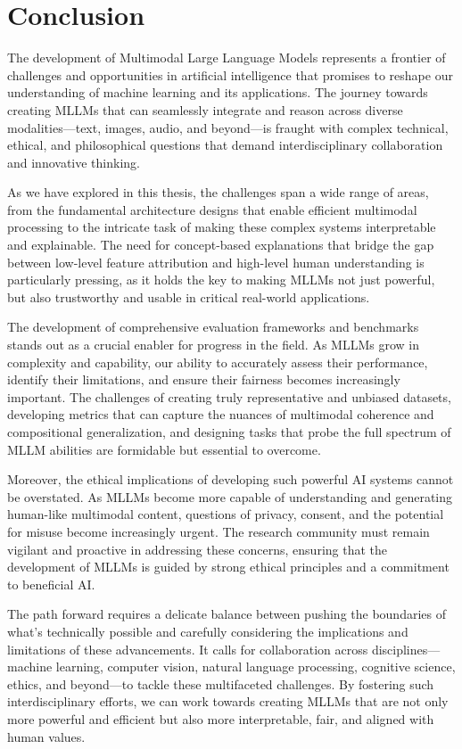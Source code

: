 \section{Conclusion}

The development of Multimodal Large Language Models represents a frontier of challenges and opportunities in artificial intelligence that promises to reshape our understanding of machine learning and its applications. The journey towards creating MLLMs that can seamlessly integrate and reason across diverse modalities—text, images, audio, and beyond—is fraught with complex technical, ethical, and philosophical questions that demand interdisciplinary collaboration and innovative thinking.

As we have explored in this thesis, the challenges span a wide range of areas, from the fundamental architecture designs that enable efficient multimodal processing to the intricate task of making these complex systems interpretable and explainable. The need for concept-based explanations that bridge the gap between low-level feature attribution and high-level human understanding is particularly pressing, as it holds the key to making MLLMs not just powerful, but also trustworthy and usable in critical real-world applications.

The development of comprehensive evaluation frameworks and benchmarks stands out as a crucial enabler for progress in the field. As MLLMs grow in complexity and capability, our ability to accurately assess their performance, identify their limitations, and ensure their fairness becomes increasingly important. The challenges of creating truly representative and unbiased datasets, developing metrics that can capture the nuances of multimodal coherence and compositional generalization, and designing tasks that probe the full spectrum of MLLM abilities are formidable but essential to overcome.

Moreover, the ethical implications of developing such powerful AI systems cannot be overstated. As MLLMs become more capable of understanding and generating human-like multimodal content, questions of privacy, consent, and the potential for misuse become increasingly urgent. The research community must remain vigilant and proactive in addressing these concerns, ensuring that the development of MLLMs is guided by strong ethical principles and a commitment to beneficial AI.

The path forward requires a delicate balance between pushing the boundaries of what's technically possible and carefully considering the implications and limitations of these advancements. It calls for collaboration across disciplines—machine learning, computer vision, natural language processing, cognitive science, ethics, and beyond—to tackle these multifaceted challenges. By fostering such interdisciplinary efforts, we can work towards creating MLLMs that are not only more powerful and efficient but also more interpretable, fair, and aligned with human values.

